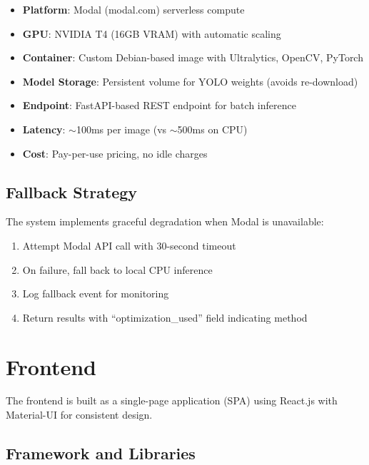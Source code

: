 \begin{itemize}[noitemsep]
    \item \textbf{Platform}: Modal (modal.com) serverless compute
    \item \textbf{GPU}: NVIDIA T4 (16GB VRAM) with automatic scaling
    \item \textbf{Container}: Custom Debian-based image with Ultralytics, OpenCV, PyTorch
    \item \textbf{Model Storage}: Persistent volume for YOLO weights (avoids re-download)
    \item \textbf{Endpoint}: FastAPI-based REST endpoint for batch inference
    \item \textbf{Latency}: $\sim$100ms per image (vs $\sim$500ms on CPU)
    \item \textbf{Cost}: Pay-per-use pricing, no idle charges
\end{itemize}

\subsection{Fallback Strategy}

The system implements graceful degradation when Modal is unavailable:

\begin{enumerate}[noitemsep]
    \item Attempt Modal API call with 30-second timeout
    \item On failure, fall back to local CPU inference
    \item Log fallback event for monitoring
    \item Return results with ``optimization\_used'' field indicating method
\end{enumerate}



\section{Frontend}

The frontend is built as a single-page application (SPA) using React.js with Material-UI for consistent design.

\subsection{Framework and Libraries}

